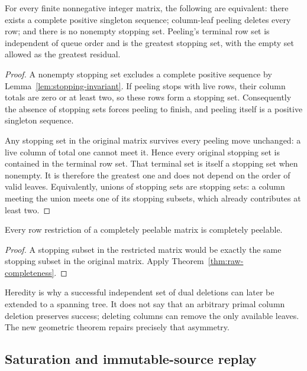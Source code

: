 \begin{theorem}
\label{thm:raw-completeness}
For every finite nonnegative integer matrix, the following are equivalent:
there exists a complete positive singleton sequence; column-leaf peeling
deletes every row; and there is no nonempty stopping set.  Peeling's
terminal row set is independent of queue order and is the greatest
stopping set, with the empty set allowed as the greatest residual.
\end{theorem}
\begin{proof}
A nonempty stopping set excludes a complete positive sequence by
Lemma~\ref{lem:stopping-invariant}.  If peeling stops with live rows, their
column totals are zero or at least two, so these rows form a stopping set.
Consequently the absence of stopping sets forces peeling to finish, and
peeling itself is a positive singleton sequence.

Any stopping set in the original matrix survives every peeling move
unchanged: a live column of total one cannot meet it.  Hence every original
stopping set is contained in the terminal row set.  That terminal set is
itself a stopping set when nonempty.  It is therefore the greatest one and
does not depend on the order of valid leaves.  Equivalently, unions of
stopping sets are stopping sets: a column meeting the union meets one of
its stopping subsets, which already contributes at least two.
\end{proof}

\begin{corollary}
\label{cor:row-heredity}
Every row restriction of a completely peelable matrix is completely
peelable.
\end{corollary}
\begin{proof}
A stopping subset in the restricted matrix would be exactly the same
stopping subset in the original matrix.  Apply
Theorem~\ref{thm:raw-completeness}.
\end{proof}

Heredity is why a successful independent set of dual deletions can later
be extended to a spanning tree.  It does not say that an arbitrary primal
column deletion preserves success; deleting columns can remove the only
available leaves.  The new geometric theorem repairs precisely that
asymmetry.

\subsection{Saturation and immutable-source replay}

